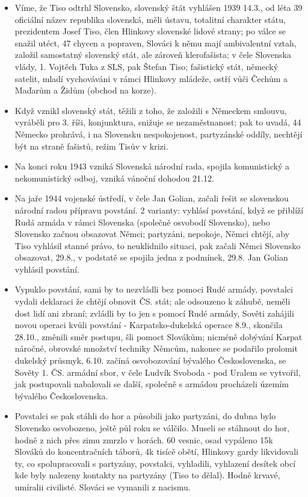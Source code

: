 \documentclass{article}
\begin{document}
\begin{itemize}
    \item Víme, že Tiso odtrhl Slovensko, slovenský štát vyhlášen 1939 14.3., od léta 39 oficiální název republika slovenská, měli ústavu, totalitní charakter státu, prezidentem Josef Tiso, člen Hlinkovy slovenské lidové strany; po válce se snažil utéct, 47 chycen a popraven, Slováci k němu mají ambivalentní vztah, založil samostatný slovenský stát, ale zároveň klerofašista; v čele Slovenska vlády, 1. Vojtěch Tuka z SLS, pak Štefan Tiso; fašistický stát, německý satelit, mladí vychováváni v rámci Hlinkovy mládeže, ostří vůči Čechům a Maďarům a Židům (obchod na korze).
    \item Když vznikl slovenský stát, těžili z toho, že založili s Německem smlouvu, vyráběli pro 3. říši, konjunktura, snižuje se nezaměstnanost; pak to uvadá, 44 Německo prohrává, i na Slovensku nespokojenost, partyzánské oddíly, nechtějí být na straně fašistů, režim Tisův v krizi.
    \item Na konci roku 1943 vzniká Slovenská národní rada, spojila komunistický a nekomunistický odboj, vzniká vánoční dohodou 21.12.
    \item Na jaře 1944 vojenské ústředí, v čele Jan Golian, začali řešit se slovenskou národní radou přípravu povstání. 2 varianty: vyhlásí povstání, když se přiblíží Rudá armáda v rámci Slovenska (společně osvobodí Slovensko), nebo Slovensko začnou obsazovat Němci; partyzáni, nepokoje, Němci chtějí, aby Tiso vyhlásil stanné právo, to neuklidnilo situaci, pak začali Němci Slovensko obsazovat, 29.8., v podstatě se spojila jedna z podmínek, 29.8. Jan Golian vyhlásil povstání.
    \item Vypuklo povstání, sami by to nezvládli bez pomoci Rudé armády, povstalci vydali deklaraci že chtějí obnovit ČS. stát; ale odsouzeno k záhubě, neměli dost lidí ani zbraní; zvládli by to jen s pomocí Rudé armády, Sověti zahájili novou operaci kvůli povstání - Karpatsko-dukelská operace 8.9., skončila 28.10., změnili směr postupu, šli pomoct Slovákům; nicméně dobývání Karpat náročné, obrovské množství techniky Němcům, nakonec se podařilo prolomit dukelský průsmyk, 6.10. začíná osvobozování bývalého Československa, se Sověty 1. ČS. armádní sbor, v čele Ludvík Svoboda - pod Uralem se vytvořil, jak postupovali nabalovali se další, společně s armádou procházeli územím bývalého Československa.
    \item Povstalci se pak stáhli do hor a působili jako partyzáni, do dubna bylo Slovensko osvobozeno, ještě půl roku se válčilo. Museli se stáhnout do hor, hodně z nich přes zimu zmrzlo v horách. 60 vesnic, osad vypáleno 15k Slováků do koncentračních táborů, 4k tisícě obětí, Hlinkovy gardy likvidovali ty, co spolupracovali s partyzány, povstalci, vyhladili, vyhlazení desítek obcí kde byly nalezeny kontakty na partyzány (Tiso to dělal). Hodně krvavé, umíralii civilisté. Slováci se vymanili z nacismu.
\end{itemize}
\end{document}
